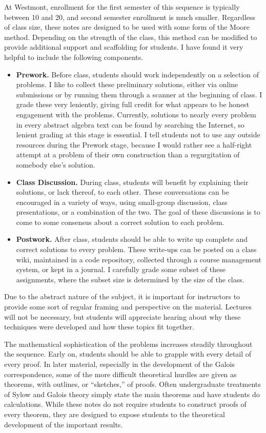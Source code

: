 \begin{annotation}
At Westmont, enrollment for the first semester of this sequence is typically between 10 and 20, and second semester enrollment is much smaller. Regardless of class size, these notes are designed to be used with some form of the Moore method. Depending on the strength of the class, this method can be modified to provide additional support and scaffolding for students. I have found it very helpful to include the following components.
\begin{itemize}
    \item \textbf{Prework.} Before class, students should work independently on a selection of problems. I like to collect these preliminary solutions, either via online submissions or by running them through a scanner at the beginning of class. I grade these very leniently, giving full credit for what appears to be honest engagement with the problems. Currently, solutions to nearly every problem in every abstract algebra text can be found by searching the Internet, so lenient grading at this stage is essential. I tell students not to use any outside resources during the Prework stage, because I would rather see a half-right attempt at a problem of their own construction than a regurgitation of somebody else's solution.
    \item \textbf{Class Discussion.} During class, students will benefit by explaining their solutions, or lack thereof, to each other. These conversations can be encouraged in a variety of ways, using small-group discussion, class presentations, or a combination of the two. The goal of these discussions is to come to some consensus about a correct solution to each problem.
    \item \textbf{Postwork.} After class, students should be able to write up complete and correct solutions to every problem. These write-ups can be posted on a class wiki, maintained in a code repository, collected through a course management system, or kept in a journal. I carefully grade some subset of these assignments, where the subset size is determined by the size of the class.
\end{itemize}

Due to the abstract nature of the subject, it is important for instructors to provide some sort of regular framing and perspective on the material. Lectures will not be necessary, but students will appreciate hearing about why these techniques were developed and how these topics fit together.

The mathematical sophistication of the problems increases steadily throughout the sequence. Early on, students should be able to grapple with every detail of every proof. In later material, especially in the development of the Galois correspondence, some of the more difficult theoretical hurdles are given as theorems, with outlines, or ``sketches,'' of proofs. Often undergraduate treatments of Sylow and Galois theory simply state the main theorems and have students do calculations. While these notes do not require students to construct proofs of every theorem, they are designed to expose students to the theoretical development of the important results.


\end{annotation}
